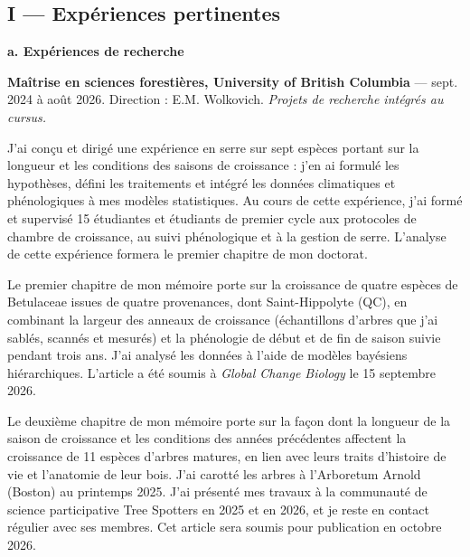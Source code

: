 \documentclass[12pt]{article}
\begin{document}
\subsection*{I --- Expériences pertinentes}
\textbf{a. Expériences de recherche} 

\textbf{Maîtrise en sciences forestières, University of British Columbia} --- sept. 2024 à août 2026. Direction : E.M. Wolkovich. \textit{Projets de recherche intégrés au cursus.} 

J'ai conçu et dirigé une expérience en serre sur sept espèces portant sur la longueur et les conditions des saisons de croissance : j'en ai formulé les hypothèses, défini les traitements et intégré les données climatiques et phénologiques à mes modèles statistiques. Au cours de cette expérience, j'ai formé et supervisé 15 étudiantes et étudiants de premier cycle aux protocoles de chambre de croissance, au suivi phénologique et à la gestion de serre. L'analyse de cette expérience formera le premier chapitre de mon doctorat. 

Le premier chapitre de mon mémoire porte sur la croissance de quatre espèces de Betulaceae issues de quatre provenances, dont Saint-Hippolyte (QC), en combinant la largeur des anneaux de croissance (échantillons d'arbres que j'ai sablés, scannés et mesurés) et la phénologie de début et de fin de saison suivie pendant trois ans. J'ai analysé les données à l'aide de modèles bayésiens hiérarchiques. L'article a été soumis à \textit{Global Change Biology} le 15 septembre 2026.

Le deuxième chapitre de mon mémoire porte sur la façon dont la longueur de la saison de croissance et les conditions des années précédentes affectent la croissance de 11 espèces d'arbres matures, en lien avec leurs traits d'histoire de vie et l'anatomie de leur bois. J'ai carotté les arbres à l'Arboretum Arnold (Boston) au printemps 2025. J'ai présenté mes travaux à la communauté de science participative Tree Spotters en 2025 et en 2026, et je reste en contact régulier avec ses membres. Cet article sera soumis pour publication en octobre 2026. 
\end{document}
